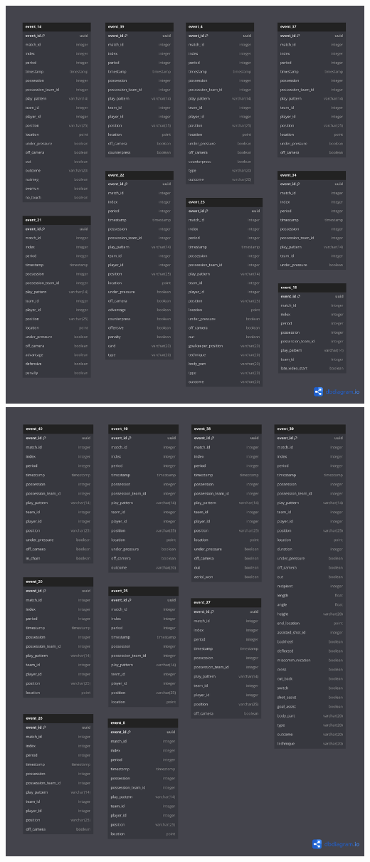 \documentclass[12pt]{article}
\begin{document}
\includegraphics[width=\textwidth]{reduction/4.png}
\includegraphics[width=\textwidth]{reduction/5.png}
\end{document}
